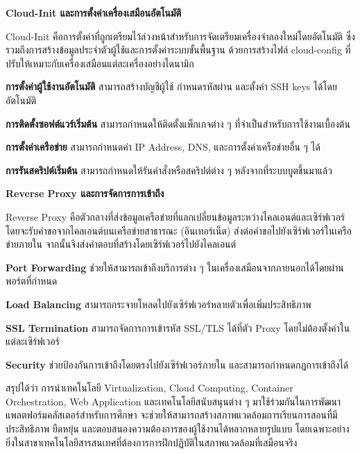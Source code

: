 \hspace*{1.3em} %
\textbf{Cloud-Init และการตั้งค่าเครื่องเสมือนอัตโนมัติ}

\hspace*{1.3em} %
Cloud-Init คือการตั้งค่าที่ถูกเตรียมไว้ล่วงหน้าสำหรับการจัดเตรียมเครื่องจำลองใหม่โดยอัตโนมัติ ซึ่งรวมถึงการสร้างข้อมูลประจำตัวผู้ใช้และการตั้งค่าระบบขั้นพื้นฐาน ด้วยการสร้างไฟล์ cloud-config ที่ปรับให้เหมาะกับเครื่องเสมือนแต่ละเครื่องอย่างไดนามิก

\begin{mycustomitem}
    \item \textbf{การตั้งค่าผู้ใช้งานอัตโนมัติ} สามารถสร้างบัญชีผู้ใช้ กำหนดรหัสผ่าน และตั้งค่า SSH keys ได้โดยอัตโนมัติ
    \item \textbf{การติดตั้งซอฟต์แวร์เริ่มต้น} สามารถกำหนดให้ติดตั้งแพ็กเกจต่าง ๆ ที่จำเป็นสำหรับการใช้งานเบื้องต้น
    \item \textbf{การตั้งค่าเครือข่าย} สามารถกำหนดค่า IP Address, DNS, และการตั้งค่าเครือข่ายอื่น ๆ ได้
    \item \textbf{การรันสคริปต์เริ่มต้น} สามารถกำหนดให้รันคำสั่งหรือสคริปต์ต่าง ๆ หลังจากที่ระบบบูตขึ้นมาแล้ว
\end{mycustomitem}

\hspace*{1.3em} %
\textbf{Reverse Proxy และการจัดการการเข้าถึง}

\hspace*{1.3em} %
Reverse Proxy คือตัวกลางที่ส่งข้อมูลเครือข่ายที่แลกเปลี่ยนข้อมูลระหว่างไคลเอนต์และเซิร์ฟเวอร์ โดยจะรับคำขอจากไคลเอนต์บนเครือข่ายสาธารณะ (อินเทอร์เน็ต) ส่งต่อคำขอไปยังเซิร์ฟเวอร์ในเครือข่ายภายใน จากนั้นจึงส่งคำตอบที่สร้างโดยเซิร์ฟเวอร์ไปยังไคลเอนต์

\begin{mycustomitem}
    \item \textbf{Port Forwarding} ช่วยให้สามารถเข้าถึงบริการต่าง ๆ ในเครื่องเสมือนจากภายนอกได้โดยผ่านพอร์ตที่กำหนด
    \item \textbf{Load Balancing} สามารถกระจายโหลดไปยังเซิร์ฟเวอร์หลายตัวเพื่อเพิ่มประสิทธิภาพ
    \item \textbf{SSL Termination} สามารถจัดการการเข้ารหัส SSL/TLS ได้ที่ตัว Proxy โดยไม่ต้องตั้งค่าในแต่ละเซิร์ฟเวอร์
    \item \textbf{Security} ช่วยป้องกันการเข้าถึงโดยตรงไปยังเซิร์ฟเวอร์ภายใน และสามารถกำหนดกฎการเข้าถึงได้
\end{mycustomitem}

\hspace*{1.3em} %
สรุปได้ว่า การนำเทคโนโลยี Virtualization, Cloud Computing, Container Orchestration, Web Application และเทคโนโลยีสนับสนุนต่าง ๆ มาใช้ร่วมกันในการพัฒนาแพลตฟอร์มคลัสเตอร์สำหรับการศึกษา จะช่วยให้สามารถสร้างสภาพแวดล้อมการเรียนการสอนที่มีประสิทธิภาพ ยืดหยุ่น และตอบสนองความต้องการของผู้ใช้งานได้หลากหลายรูปแบบ โดยเฉพาะอย่างยิ่งในสาขาเทคโนโลยีสารสนเทศที่ต้องการการฝึกปฏิบัติในสภาพแวดล้อมที่เสมือนจริง


